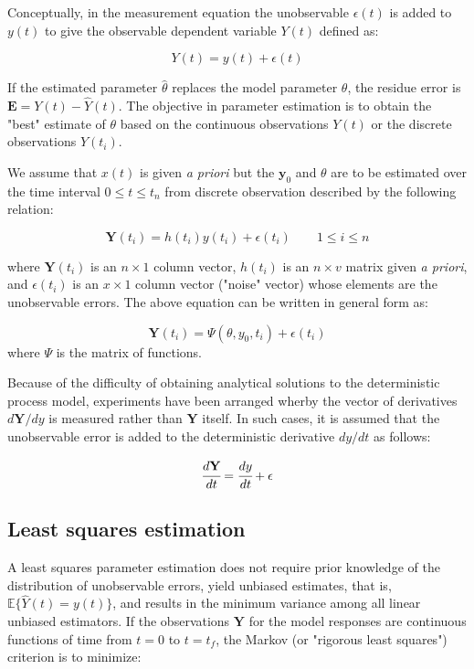 \documentclass[a4paper,fleqn]{cas-dc}
\begin{document}
Conceptually, in the measurement equation the unobservable $\epsilon(t)$ is added to $y(t)$ to give the observable dependent variable $Y(t)$ defined as:

\begin{equation}
	Y(t) = y(t) + \epsilon(t)
\end{equation}

If the estimated parameter $\hat{\theta}$ replaces the model parameter $\theta$, the residue error is $\textbf{E} = Y(t) - \hat{Y}(t)$. The objective in parameter estimation is to obtain the "best" estimate of $\theta$ based on the continuous observations $Y(t)$ or the discrete observations $Y(t_i)$. 

We assume that $x(t)$ is given \textit{a priori} but the $\textbf{y}_0$ and $\theta$ are to be estimated over the time interval $0 \leq t \leq t_n$ from discrete observation described by the following relation:

\begin{equation}
	\textbf{Y}(t_i) = h(t_i)y(t_i) + \epsilon(t_i) \qquad 1 \leq i \leq n
\end{equation}

where $\textbf{Y}(t_i)$ is an $n \times 1$ column vector, $h(t_i)$ is an $n \times v$ matrix given \textit{a priori}, and $\epsilon (t_i)$ is an $x \times 1$ column vector ("noise" vector) whose elements are the unobservable errors. The above equation can be written in general form as:

\begin{equation} \label{EQ: Measurment_noise}
	\textbf{Y}(t_i) = \Psi(\theta, y_0, t_i) + \epsilon(t_i)
\end{equation}
where $\Psi$ is the matrix of functions.

Because of the difficulty of obtaining analytical solutions to the deterministic process model, experiments have been arranged wherby the vector of derivatives $d\textbf{Y}/dy$ is measured rather than \textbf{Y} itself. In such cases, it is assumed that the unobservable error is added to the deterministic derivative $dy/dt$ as follows:

\begin{equation}
	\cfrac{d\textbf{Y}}{dt} = \cfrac{dy}{dt} + \epsilon
\end{equation}

\subsection{Least squares estimation}
A least squares parameter estimation does not require prior knowledge of the distribution of unobservable errors, yield  unbiased estimates, that is, $ \mathbb{E}\{\hat{Y}(t) = y(t) \} $, and results in the minimum variance among all linear unbiased estimators. If the observations $\textbf{Y}$ for the model responses are continuous functions of time from $t = 0$ to $t = t_f$, the Markov (or "rigorous least squares") criterion is to minimize:
\end{document}
